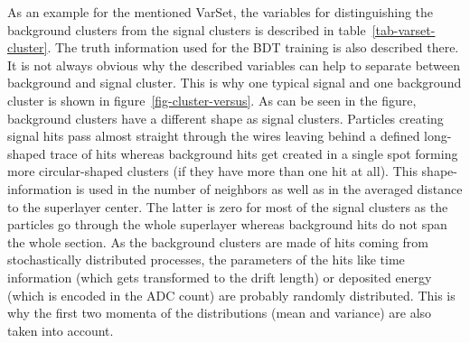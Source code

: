 As an example for the mentioned VarSet, the variables for distinguishing the background clusters from the signal clusters is described in table~\ref{tab-varset-cluster}. The truth information used for the BDT training is also described there. It is not always obvious why the described variables can help to separate between background and signal cluster. This is why one typical signal and one background cluster is shown in figure~\ref{fig-cluster-versus}. As can be seen in the figure, background clusters have a different shape as signal clusters. Particles creating signal hits pass almost straight through the wires leaving behind a defined long-shaped trace of hits whereas background hits get created in a single spot forming more circular-shaped clusters (if they have more than one hit at all). This shape-information is used in the number of neighbors as well as in the averaged distance to the superlayer center. The latter is zero for most of the signal clusters as the particles go through the whole superlayer whereas background hits do not span the whole section. As the background clusters are made of hits coming from stochastically distributed processes, the parameters of the hits like time information (which gets transformed to the drift length) or deposited energy (which is encoded in the ADC count) are probably randomly distributed. This is why the first two momenta of the distributions (mean and variance) are also taken into account.

